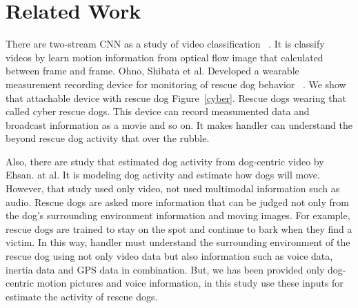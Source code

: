 \documentclass[MIRU,submit,english]{miru2019e}
\begin{document}
\section{Related Work}
There are two-stream CNN as a study of video classification ~\cite{simonyan2014two}.
It is classify videos by learn motion information from optical flow image that calculated between frame and frame.
Ohno, Shibata et al. Developed a wearable measurement recording device for monitoring of rescue dog behavior ~\cite{dog01}.
We show that attachable device with rescue dog Figure~\ref{cyber}.
Rescue dogs wearing that called cyber rescue dogs.
This device can record measumented data and broadcast information as a movie and so on.
It makes handler can understand the beyond rescue dog activity that over the rubble.

Also, there are study that estimated dog activity from dog-centric video by Ehsan. at al.
It is modeling dog activity and estimate how dogs will move.
However, that study used only video, not used multimodal information such as audio.
Rescue dogs are asked more information that can be judged not only from the dog's surrounding environment information and moving images.
For example, rescue dogs are trained to stay on the spot and continue to bark when they find a victim.
In this way, handler must understand the surrounding environment of the rescue dog using not only video data but also information such as voice data, inertia data and GPS data in combination.
But, we has been provided only dog-centric motion pictures and voice information, in this study use these inputs for estimate the activity of rescue dogs.
\end{document}
